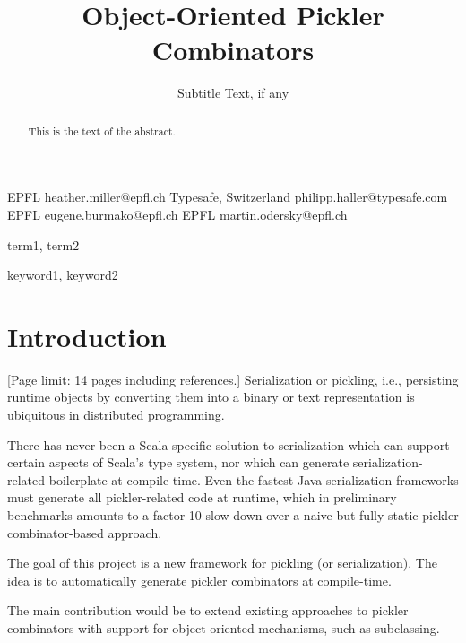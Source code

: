 \documentclass[preprint,10pt]{sigplanconf}
\begin{document}
\copyrightdata{[to be supplied]}


\title{Object-Oriented Pickler Combinators}
\subtitle{Subtitle Text, if any}

           {EPFL}
           {heather.miller@epfl.ch}
           {Typesafe, Switzerland}
           {philipp.haller@typesafe.com}
           {EPFL}
           {eugene.burmako@epfl.ch}
           {EPFL}
           {martin.odersky@epfl.ch}

\maketitle

\begin{abstract}
This is the text of the abstract.
\end{abstract}


\terms
term1, term2

\keywords
keyword1, keyword2

\section{Introduction}

[Page limit: 14 pages including references.]
Serialization or pickling, i.e., persisting runtime objects by
converting them into a binary or text representation is ubiquitous in
distributed programming.

There has never been a Scala-specific solution to serialization which
can support certain aspects of Scala's type system, nor which can
generate serialization-related boilerplate at compile-time. Even the
fastest Java serialization frameworks must generate all
pickler-related code at runtime, which in preliminary benchmarks
amounts to a factor 10 slow-down over a naive but fully-static pickler
combinator-based approach.

The goal of this project is a new framework for pickling (or
serialization). The idea is to automatically generate pickler
combinators at compile-time.

The main contribution would be to extend existing approaches to
pickler combinators with support for object-oriented mechanisms, such
as subclassing.
\end{document}
